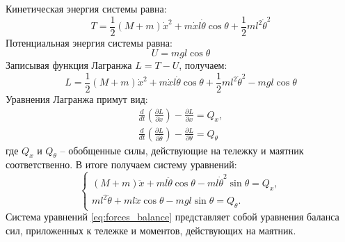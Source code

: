 Кинетическая энергия системы равна:
\begin{equation}
    T = \frac{1}{2} (M + m)\dot{x}^2 + m\dot{x}l\dot{\theta}\cos\theta + \frac{1}{2}ml^2\dot{\theta}^2
\end{equation}
Потенциальная энергия системы равна:
\begin{equation}
    U = mgl\cos\theta
\end{equation}
Записывая функция Лагранжа $L = T - U$, получаем: 
\begin{equation}
    L = \frac{1}{2} (M + m)\dot{x}^2 + m\dot{x}l\dot{\theta}\cos\theta + \frac{1}{2}ml^2\dot{\theta}^2 - mgl\cos\theta
\end{equation}
Уравнения Лагранжа примут вид:
\begin{equation}
    \begin{array}{cc}
        \frac{d}{dt} \left( \frac{\partial L}{\partial \dot{x}} \right) - \frac{\partial L}{\partial x} = Q_x, \\
        \frac{d}{dt} \left( \frac{\partial L}{\partial \dot{\theta}} \right) - \frac{\partial L}{\partial \theta} = Q_{\theta}
    \end{array}
\end{equation}
где $Q_x$ и $Q_{\theta}$ -- обобщенные силы, действующие на тележку и маятник соответственно. В итоге получаем систему уравнений:
\begin{equation}
    \begin{cases}
        (M + m)\ddot{x} + ml\ddot{\theta}\cos\theta - ml\dot{\theta}^2\sin\theta = Q_x, \\
        ml^2\ddot{\theta} + ml\ddot{x}\cos\theta - mgl\sin\theta = Q_{\theta}.
    \end{cases}
    \label{eq:forces_balance}
\end{equation}
Система уравнений \eqref{eq:forces_balance} представляет собой уравнения баланса сил, 
приложенных к тележке и моментов, действующих на маятник.

